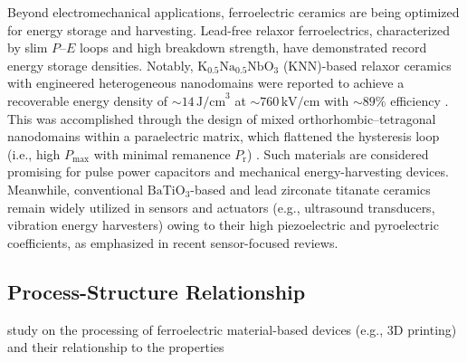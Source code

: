 \documentclass[a4paper,fleqn]{cas-sc}
\begin{document}
\par Beyond electromechanical applications, ferroelectric ceramics are being optimized for energy storage and harvesting. Lead-free relaxor ferroelectrics, characterized by slim $P$--$E$ loops and high breakdown strength, have demonstrated record energy storage densities. Notably, $\mathrm{K}_{0.5}\mathrm{Na}_{0.5}\mathrm{NbO}_3$ (KNN)-based relaxor ceramics with engineered heterogeneous nanodomains were reported to achieve a recoverable energy density of $\sim\!14\,\mathrm{J/cm}^3$ at $\sim\!760\,\mathrm{kV/cm}$ with $\sim\!89\%$ efficiency \cite{chai2025excellent}. This was accomplished through the design of mixed orthorhombic--tetragonal nanodomains within a paraelectric matrix, which flattened the hysteresis loop (i.e., high $P_{\mathrm{max}}$ with minimal remanence $P_{\mathrm{r}}$) \cite{chai2025excellent}. Such materials are considered promising for pulse power capacitors and mechanical energy-harvesting devices. Meanwhile, conventional $\mathrm{BaTiO}_3$-based and lead zirconate titanate ceramics remain widely utilized in sensors and actuators (e.g., ultrasound transducers, vibration energy harvesters) owing to their high piezoelectric and pyroelectric coefficients, as emphasized in recent sensor-focused reviews.

\subsection{Process-Structure Relationship} \label{PS}
study on the processing  of ferroelectric material-based devices (e.g., 3D printing) and their relationship to the properties
\end{document}
